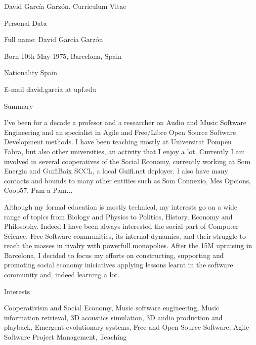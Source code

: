 \documentclass{article}
\begin{document}
\setlength{\cvlabelwidth}{45mm}

\begin{cv}{David García Garzón. Curriculum Vitae}

\begin{cvlist}{Personal Data}
\item[Full name:] David García Garzón
\item[Born] 10th May 1975, Barcelona, Spain
\item[Nationality] Spain
\item[E-mail] david.garcia at upf.edu
\end{cvlist}

\begin{cvlist}{Summary}
\item[] I've been for a decade a profesor and a researcher on Audio and Music Software Engineering
and an specialist in Agile and Free/Libre Open Source Software Development methods.
I have been teaching mostly at Universitat Pompeu Fabra, but also other universities, an activity that I enjoy a lot.
Currently I am involved in several cooperatives of the Social Economy,
currently working at Som Energia and GuifiBaix SCCL,
a local Guifi.net deployer.
I also have many contacts and bounds to many other entities such as
Som Connexio, Mes Opcions, Coop57, Pam a Pam...

Although my formal education is mostly technical, my interests go on a wide range of topics
from Biology and Physics to Politics, History, Economy and Philosophy.
Indeed I have been always interested the social part of Computer Science,
Free Software communities, its internal dynamics, and
their struggle to reach the masses in rivalry with powerfull monopolies.
After the 15M upraising in Barcelona, I decided to focus my efforts
on constructing, supporting and promoting social economy iniciatives
applying lessons learnt in the software community and, indeed learning a lot.

\end{cvlist}

\begin{cvlist}{Interests}
\item[] Cooperativism and Social Economy, Music software engineering, Music information retrieval, 3D acoustics simulation, 3D audio production and playback, Emergent evolutionary systems, Free and Open Source Software, Agile Software Project Management, Teaching
\end{cvlist}




\end{cv}
\end{document}
